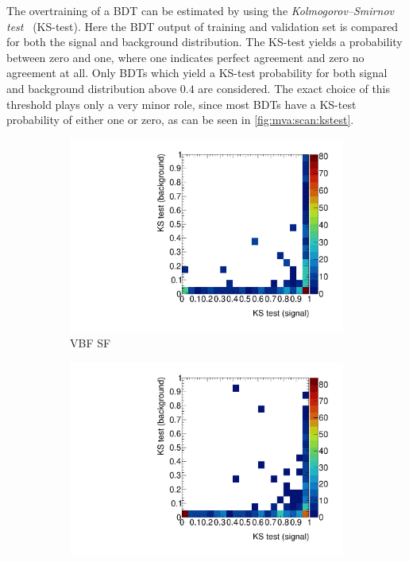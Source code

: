 The overtraining of a BDT can be estimated by using the \emph{Kolmogorov--Smirnov test}~\cite{KSk, KSs} (KS-test).
Here the BDT output of training and validation set is compared for both the signal and background distribution.
The KS-test yields a probability between zero and one, where one indicates perfect agreement and zero no agreement at all.
Only BDTs which yield a KS-test probability for both signal and background distribution above $0.4$ are considered.
The exact choice of this threshold plays only a very minor role, since most BDTs have a KS-test probability of either one or zero,
as can be seen in \cref{fig:mva:scan:kstest}.

\begin{figure}[htb]
    \centering
    \begin{subfigure}[t]{0.45\textwidth}
        \includegraphics[width=\textwidth]{./plots/mva/scan/VBF_SF_ks_test_sig_vs_bkg.pdf}
        \caption{VBF SF}
    \end{subfigure}
    \begin{subfigure}[t]{0.45\textwidth}
        \includegraphics[width=\textwidth]{./plots/mva/scan/VBF_DF_ks_test_sig_vs_bkg.pdf}

\end{subfigure}
\end{figure}
